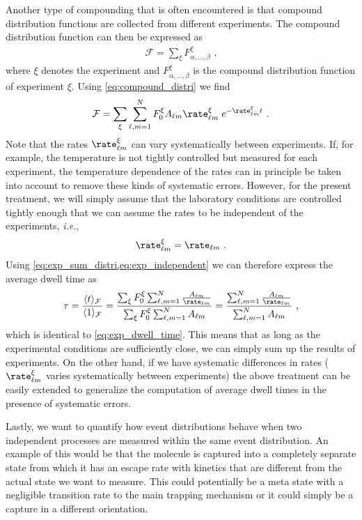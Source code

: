 Another type of compounding that is often encountered is that compound distribution functions are collected
from different experiments. The compound distribution function can then be expressed as
%
\begin{align*}
    \mathcal{F} = \sum_\xi F^{\xi}_{\alpha,\dots,\beta}
    \text{ ,}
\end{align*}
%
where $\xi$ denotes the experiment and $F^{\xi}_{\alpha,\dots,\beta}$ is the compound distribution function of
experiment $\xi$. Using \cref{eq:compound_distri} we find
%
\begin{align}\label{eq:exp_sum_distri}
    \mathcal{F} = \sum_\xi\sum_{\ell, m=1}^N F_0^\xi A_{\ell m}\rate^{\xi} _{\ell m}
    \;e^{-\rate^\xi_{\ell m} t}
    \text{ .}
\end{align}
%
Note that the rates $\rate^\xi_{\ell m}$ can vary systematically between experiments. If, for example, the
temperature is not tightly controlled but measured for each experiment, the temperature dependence of the
rates can in principle be taken into account to remove these kinds of systematic errors. However, for the
present treatment, we will simply assume that the laboratory conditions are controlled tightly enough that we
can assume the rates to be independent of the experiments, \textit{i.e.},
%
\begin{align}\label{eq:exp_independent}
   \rate^\xi_{\ell m} = \rate_{\ell m}
   \text{ .}
\end{align}
%
Using \cref{eq:exp_sum_distri,eq:exp_independent} we can therefore express the average dwell time as
%
\begin{align*}
    \tau = \frac{\langle t\rangle_{\mathcal{F}}}{\langle 1\rangle_{\mathcal{F}}}
    =\frac{\sum_\xi F^\xi_{0}\sum_{\ell, m=1}^N \frac{A_{\ell m} }{\rate_{\ell
        m}}}{\sum_\xi F^\xi_{0}\sum_{\ell, m=1}^N A_{\ell m}}
    = \frac{\sum_{\ell, m=1}^N \frac{A_{\ell m} }{\rate_{\ell m}}}{%
        \sum_{\ell, m=1}^N A_{\ell m}}
    \text{ ,}
\end{align*}
%
which is identical to \cref{eq:exp_dwell_time}. This means that as long as the experimental conditions are
sufficiently close, we can simply sum up the results of experiments. On the other hand, if we have systematic
differences in rates (\ie~$\rate^\xi_{\ell m}$ varies systematically between experiments) the above treatment
can be easily extended to generalize the computation of average dwell times in the presence of systematic
errors.

Lastly, we want to quantify how event distributions behave when two independent processes are measured within
the same event distribution. An example of this would be that the molecule is captured into a completely
separate state from which it has an escape rate with kinetics that are different from the actual state we want
to measure. This could potentially be a meta state with a negligible transition rate to the main trapping
mechanism or it could simply be a capture in a different orientation.

